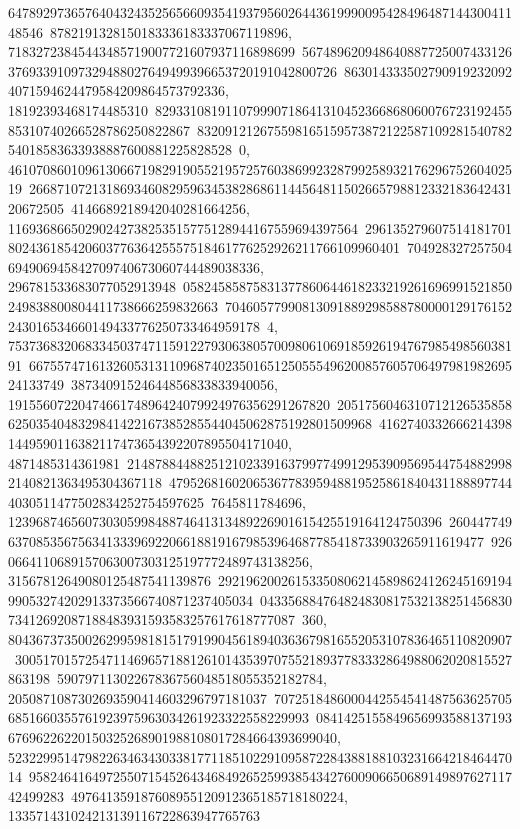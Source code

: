 {{{64789297365764043243525656609354193795602644361999009542849648714430041148546\
8782191328150183336183337067119896, 71832723845443485719007721607937116898699\
56748962094864088772500743312637693391097329488027649499396653720191042800726\
8630143335027909192320924071594624479584209864573792336, 18192393468174485310\
82933108191107999071864131045236686806007672319245585310740266528786250822867\
83209121267559816515957387212258710928154078254018583633938887600881225828528\
0, 46107086010961306671982919055219572576038699232879925893217629675260402519\
26687107213186934608295963453828686114456481150266579881233218364243120672505\
4146689218942040281664256, 11693686650290242738253515775128944167559694397564\
29613527960751418170180243618542060377636425557518461776252926211766109960401\
704928327257504694906945842709740673060744489038336, 296781533683077052913948\
05824585875831377860644618233219261696991521850249838800804411738666259832663\
70460577990813091889298588780000129176152243016534660149433776250733464959178\
4, 75373683206833450374711591227930638057009806106918592619476798549856038191\
66755747161326053131109687402350165125055549620085760570649798198269524133749\
38734091524644856833833940056, 1915560722047466174896424079924976356291267820\
20517560463107121265358586250354048329841422167385285544045062875192801509968\
41627403326662143981449590116382117473654392207895504171040, 4871485314361981\
21487884488251210233916379977499129539095695447548829982140821363495304367118\
47952681602065367783959488195258618404311888977444030511477502834252754597625\
7645811784696, 12396874656073030599848874641313489226901615425519164124750396\
26044774963708535675634133396922066188191679853964687785418733903265911619477\
9260664110689157063007303125197772489743138256, 31567812649080125487541139876\
29219620026153350806214589862412624516919499053274202913373566740871237405034\
04335688476482483081753213825145683073412692087188483931593583257617618777087\
360, 804367373500262995981815179199045618940363679816552053107836465110820907\
30051701572547114696571881261014353970755218937783332864988062020815527863198\
59079711302267836756048518055352182784, 2050871087302693590414603296797181037\
70725184860004425545414875636257056851660355761923975963034261923322558229993\
084142515584965699358813719367696226220150325268901988108017284664393699040, 
   52322995147982263463430338177118510229109587228438818810323166421846447014\
95824641649725507154526434684926525993854342760090665068914989762711742499283\
497641359187608955120912365185718180224, 133571431024213139116722863947765763\
}}}
